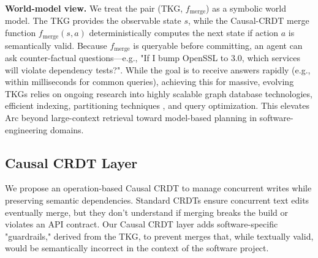 \documentclass{article}
\begin{document}
\textbf{World-model view.} We treat the pair (TKG, $f_{\text{merge}}$) as a symbolic world model. The TKG provides the observable state $s$, while the Causal-CRDT merge function $f_{\text{merge}}(s, a)$ deterministically computes the next state if action $a$ is semantically valid. Because $f_{\text{merge}}$ is queryable before committing, an agent can ask counter-factual questions—e.g., "If I bump OpenSSL to 3.0, which services will violate dependency tests?". While the goal is to receive answers rapidly (e.g., within milliseconds for common queries), achieving this for massive, evolving TKGs relies on ongoing research into highly scalable graph database technologies, efficient indexing, partitioning techniques \cite{ref24, ref32, ref33}, and query optimization. This elevates Arc beyond large-context retrieval toward model-based planning in software-engineering domains.

\subsection{Causal CRDT Layer}

We propose an operation-based Causal CRDT to manage concurrent writes while preserving semantic dependencies. Standard CRDTs ensure concurrent text edits eventually merge, but they don't understand if merging breaks the build or violates an API contract. Our Causal CRDT layer adds software-specific "guardrails," derived from the TKG, to prevent merges that, while textually valid, would be semantically incorrect in the context of the software project.
\end{document}
